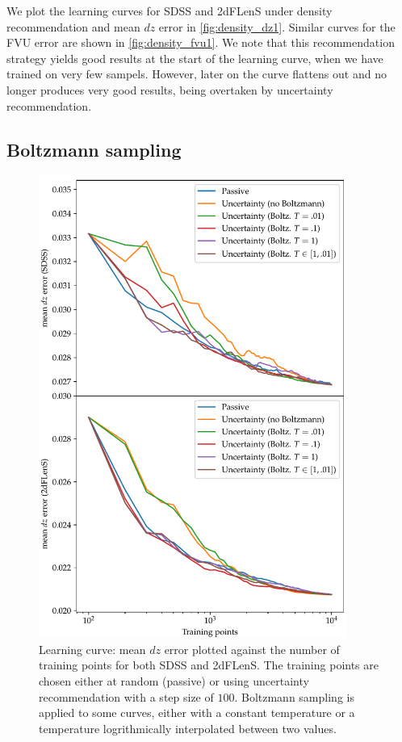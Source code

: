 \documentclass[11pt,twoside,openright]{report}
\begin{document}
  We plot the learning curves for SDSS and 2dFLenS under density recommendation and mean $dz$ error in \cref{fig:density_dz1}. Similar curves for the FVU error are shown in \cref{fig:density_fvu1}. We note that this recommendation strategy yields good results at the start of the learning curve, when we have trained on very few sampels. However, later on the curve flattens out and no longer produces very good results, being overtaken by uncertainty recommendation.

\subsection{Boltzmann sampling}

  \begin{figure}
    \centering
    \includegraphics[width=0.9\textwidth]{boltz_uncertainty_dz1.pdf}
    \caption{Learning curve: mean $dz$ error plotted against the number of training points for both SDSS and 2dFLenS. The training points are chosen either at random (passive) or using uncertainty recommendation with a step size of $100$. Boltzmann sampling is applied to some curves, either with a constant temperature or a temperature logrithmically interpolated between two values.}
    \label{fig:boltz_uncertainty_dz1}
  \end{figure}
\end{document}
